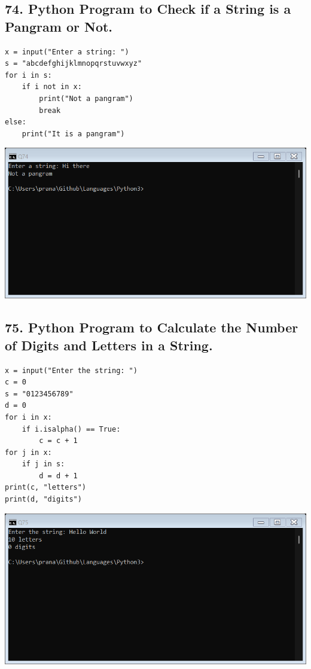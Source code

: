 \documentclass[12pt]{article}
\begin{document}
\subsection*{74. Python Program to Check if a String is a Pangram or Not.}
\begin{verbatim}
x = input("Enter a string: ")
s = "abcdefghijklmnopqrstuvwxyz"
for i in s:
    if i not in x:
        print("Not a pangram")
        break
else:
    print("It is a pangram")
\end{verbatim}
\includegraphics[width=\linewidth]{images/74.png}

\subsection*{75. Python Program to Calculate the Number of Digits and Letters in a String.}
\begin{verbatim}
x = input("Enter the string: ")
c = 0
s = "0123456789"
d = 0
for i in x:
    if i.isalpha() == True:
        c = c + 1
for j in x:
    if j in s:
        d = d + 1
print(c, "letters")
print(d, "digits")
\end{verbatim}
\includegraphics[width=\linewidth]{images/75.png}
\end{document}
